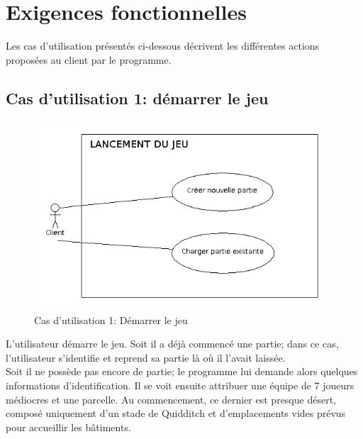\documentclass[a4paper,titlepage]{scrreprt}
\begin{document}
  
\section{Exigences fonctionnelles}
  
  Les cas d'utilisation présentés ci-dessous décrivent les différentes actions proposées au client par le programme.

  \subsection{Cas d'utilisation 1: démarrer le jeu}
  \begin{figure}[H]
    \center
    \includegraphics[scale=0.5]{uml/useCaseView/Lancementdujeu.png}
    \caption{Cas d'utilisation 1: Démarrer le jeu}
  \end{figure}	
    L'utilisateur démarre le jeu. Soit il a déjà commencé une \gls{partie}; dans ce cas, l'utilisateur s'identifie et reprend sa partie là où il l'avait laissée. \\
    Soit il ne possède pas encore de partie; le programme lui demande alors quelques informations d'identification. 
    Il se voit ensuite attribuer une équipe de 7 \gls{joueur}s médiocres et une \gls{parcelle}. 
    Au commencement, ce dernier est presque désert, composé uniquement d'un 
    \gls{stade} de \gls{Quidditch} et d'emplacements vides prévus pour accueillir les bâtiments.
\end{document}
